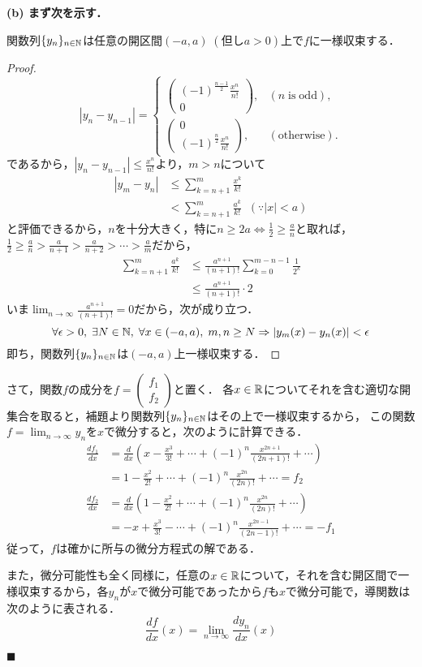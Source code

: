 \documentclass[uplatex,dvipdfmx]{jsarticle}
\begin{document}
\bf{(b)} まず次を示す．
\begin{lemma*}
    関数列$\{y_n\}_{n\in\mathbb{N}}$は任意の開区間$(-a,a)\;(但しa>0)$上で$f$に一様収束する．
\end{lemma*}
\begin{proof}
    \[|y_n-y_{n-1}|=\begin{cases}
        \begin{pmatrix}(-1)^{\frac{n-1}{2}}\frac{x^n}{n!}\\0\end{pmatrix},&(n\;\mathrm{is\;odd}),\\
        \begin{pmatrix}0\\(-1)^{\frac{n}{2}}\frac{x^{n}}{n!}\end{pmatrix},&(\mathrm{otherwise}).
    \end{cases}\]
    であるから，$|y_n-y_{n-1}|\le\frac{x^n}{n!}$より，$m>n$について
    \begin{align*}
        |y_m-y_n| &\le \sum^m_{k=n+1}\frac{x^k}{k!}\\
        &< \sum^m_{k=n+1}\frac{a^k}{k!}\;\;(\because |x|<a)
    \end{align*}
    と評価できるから，$n$を十分大きく，特に$n\ge 2a\Leftrightarrow\frac{1}{2}\ge\frac{a}{n}$と取れば，
    $\frac{1}{2}\ge\frac{a}{n}>\frac{a}{n+1}>\frac{a}{n+2}>\cdots>\frac{a}{m}$だから，
    \begin{align*}
        \sum^m_{k=n+1}\frac{a^k}{k!} &\le \frac{a^{n+1}}{(n+1)!}\sum^{m-n-1}_{k=0}\frac{1}{2^k}\\
        &\le\frac{a^{n+1}}{(n+1)!}\cdot 2
    \end{align*}
    いま$\lim_{n\to\infty}\frac{a^{n+1}}{(n+1)!}=0$だから，次が成り立つ．
    \[ \forall\epsilon>0,\;\exists N\in\mathbb{N},\;\forall x\in (-a,a),\; m,n\ge N\Rightarrow |y_m(x)-y_n(x)|<\epsilon \]
    即ち，関数列$\{y_n\}_{n\in\mathbb{N}}$は$(-a,a)$上一様収束する．
\end{proof}

さて，関数$f$の成分を$f=\begin{pmatrix}f_1\\f_2\end{pmatrix}$と置く．
各$x\in\mathbb{R}$についてそれを含む適切な開集合を取ると，補題より関数列$\{y_n\}_{n\in\mathbb{N}}$はその上で一様収束するから，
この関数$f=\lim_{n\to\infty}y_n$を$x$で微分すると，次のように計算できる．
\begin{align*}
    \frac{df_1}{dx} &= \frac{d}{dx}\left(x-\frac{x^3}{3!}+\cdots+(-1)^{n}\frac{x^{2n+1}}{(2n+1)!}+\cdots\right)\\
    &= 1-\frac{x^2}{2!}+\cdots+(-1)^{n}\frac{x^{2n}}{(2n)!}+\cdots = f_2\\
    \frac{df_2}{dx} &= \frac{d}{dx}\left(1-\frac{x^2}{2!}+\cdots+(-1)^{n}\frac{x^{2n}}{(2n)!}+\cdots\right)\\
    &= -x+\frac{x^3}{3!}-\cdots+(-1)^{n}\frac{x^{2n-1}}{(2n-1)!}+\cdots = -f_1
\end{align*}
従って，$f$は確かに所与の微分方程式の解である．

また，微分可能性も全く同様に，任意の$x\in\mathbb{R}$について，それを含む開区間で一様収束するから，各$y_n$が$x$で微分可能であったから$f$も$x$で微分可能で，導関数は次のように表される．
\[ \frac{df}{dx}(x) = \lim_{n\to\infty}\frac{dy_n}{dx}(x) \]
\begin{flushright}
    $\blacksquare$
\end{flushright}
\end{document}
